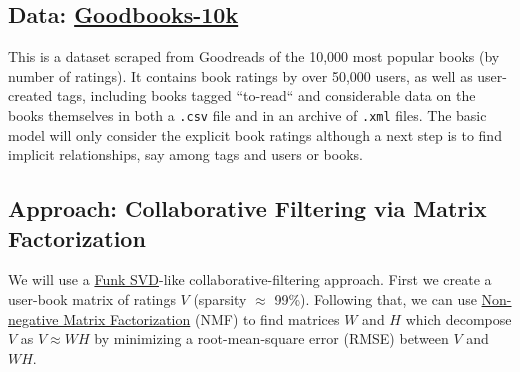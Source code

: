 \documentclass[11pt]{article}
\begin{document}
%
%


    \hypertarget{data}{%
\subsection{Data: \href{https://github.com/zygmuntz/goodbooks-10k}{Goodbooks-10k}}\label{data}}

This is a dataset scraped from Goodreads of the 10,000 most popular books (by number of ratings). It contains book ratings by over 50,000 users, as well as user-created tags, including books tagged ``to-read`` and considerable data on the books themselves in both a \texttt{.csv} file and in an archive of \texttt{.xml} files. The basic model will only consider the explicit book ratings although a next step is to find implicit relationships, say among tags and users or books.
    
    
    
    \hypertarget{approach}{%
\subsection{Approach: Collaborative Filtering via Matrix Factorization}}

We will use a \href{https://en.wikipedia.org/wiki/Matrix_factorization_(recommender_systems)#Funk_SVD}{Funk SVD}-like collaborative-filtering approach.
First we create a user-book matrix of ratings $V$ (sparsity $\approx$ 99\%). 
Following that, we can use \href{http://scikit-learn.org/stable/modules/generated/sklearn.decomposition.NMF.html}{Non-negative Matrix Factorization} (NMF) to find matrices $W$ and $H$ which decompose $V$ as $V \approx WH$ by minimizing a root-mean-square error (RMSE) between $V$ and $WH$.
\end{document}

